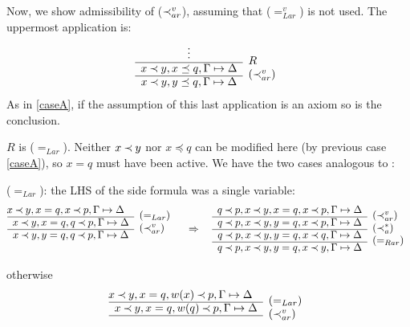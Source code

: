\begin{PROOF}
\begin{LS}
\item
Now, we show admissibility of ($\mathbin{\prec}_{ar}^v$), assuming that ($=_{Lar}^v$) is not used.
The uppermost application is:
\[ \begin{array}{cl}
\vdots          & \raisebox{-1.2ex}[1.5ex][0ex]{$R$} \\ \cline{1-1}
x\Incl y, x\preceq q, \GSD &
\raisebox{-1.2ex}[1.5ex][0ex]{($\Incl_{ar}^v$)} \\ \cline{1-1}
x\Incl y, y\preceq q, \GSD
\end{array}
\]
As in \ref{caseA}, if the assumption of this last application is an axiom
so is the conclusion. 
\begin{LSA}
\item $R$ is ($=_{Lar}$). Neither $x\mathbin{\prec} y$ nor $x\preceq q$ can be modified here (by 
previous case \ref{caseA}), so $x=q$ must have been active. We have the two cases
analogous to :
\begin{LSB}
\item ($=_{Lar}$): the LHS of the side formula was a single variable:
\[ \begin{array}{cl} \hspace*{-1em}
x\Incl y, x=q, x\Incl p,\GSD    & \raisebox{-1.2ex}[1.5ex][0ex]{($=_{Lar}$)} \\ \cline{1-1}
x\Incl y, x=q, q\Incl p, \GSD &
\raisebox{-1.2ex}[1.5ex][0ex]{($\Incl_{ar}^v$)} \\ \cline{1-1}
x\Incl y, y=q, q\Incl p,\GSD \\ \ 
\end{array}
\conv
\begin{array}{cl}
q\Incl p, x\Incl y, x=q, x\Incl p,\GSD    & \raisebox{-1.2ex}[1.5ex][0ex]{($\Incl_{ar}^v$)} \\ \cline{1-1}
q\Incl p, x\Incl y, y=q, x\Incl p, \GSD &
\raisebox{-1.2ex}[1.5ex][0ex]{($\Incl_a^*$)} \\ \cline{1-1}
q\Incl p, x\Incl y, y=q, x\Incl q, \GSD &
\raisebox{-1.2ex}[1.5ex][0ex]{($=_{Rar}$)} \\ \cline{1-1}
q\Incl p, x\Incl y, y=q, x\Incl y, \GSD &
\end{array}
\]
\item otherwise
\[ \begin{array}{cl} \hspace*{-1em}
x\Incl y, x=q, w(x)\Incl p,\GSD  & \raisebox{-1.2ex}[1.5ex][0ex]{($=_{Lar}$)} \\ \cline{1-1}
x\Incl y, x=q, w(q)\Incl p, \GSD &
\raisebox{-1.2ex}[1.5ex][0ex]{($\Incl_{ar}^v$)} \\ \cline{1-1}

\end{array}\]
\end{LSB}
\end{LSA}
\end{LS}
\end{PROOF}

